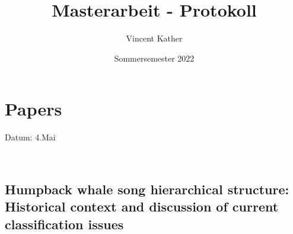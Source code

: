 \documentclass[12pt,a4paper]{article}
\date{Sommersemester 2022}
\begin{document}

\title{Masterarbeit - Protokoll}
\author{Vincent Kather}
\maketitle
\vspace{5 cm}
\hypersetup{linkcolor=black}
\tableofcontents
\listoffigures
\listoftables
\hypersetup{linkcolor=red}
\newpage

\newpage
\section{Papers}
\addtocounter{section}{1}
Datum: 4.Mai \ 

\noindent\hrulefill  \


\subsection{Humpback whale song hierarchical structure: Historical context and discussion of current classification issues } %
\label{sub:Cholewiak-2013-Marine Mammal Science}
\end{document}
